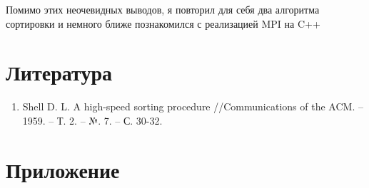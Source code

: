\documentclass[14pt, a4paper]{extarticle}
\begin{document}
        Помимо этих неочевидных выводов, я повторил для себя два алгоритма сортировки и немного ближе познакомился с реализацией MPI на C++

	\newpage

	\section{Литература}
	\begin{enumerate}
		\item Shell D. L. A high-speed sorting procedure //Communications of the ACM. – 1959. – Т. 2. – №. 7. – С. 30-32.
	\end{enumerate}
	\newpage

	\section{Приложение}
\end{document}
